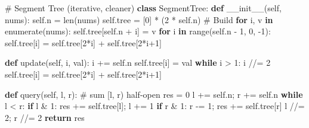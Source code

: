\documentclass[11pt]{article}
\newenvironment{Shaded}{\begin{snugshade}}{\end{snugshade}}
\newcommand{\BuiltInTok}[1]{\textcolor[rgb]{0.50,0.55,0.55}{#1}}
\newcommand{\CommentTok}[1]{\textcolor[rgb]{0.48,0.49,0.49}{#1}}
\newcommand{\ControlFlowTok}[1]{\textcolor[rgb]{0.99,0.74,0.29}{\textbf{#1}}}
\newcommand{\DecValTok}[1]{\textcolor[rgb]{0.96,0.45,0.00}{#1}}
\newcommand{\FunctionTok}[1]{\textcolor[rgb]{0.56,0.27,0.68}{#1}}
\newcommand{\KeywordTok}[1]{\textcolor[rgb]{0.81,0.81,0.76}{\textbf{#1}}}
\newcommand{\NormalTok}[1]{\textcolor[rgb]{0.81,0.81,0.76}{#1}}
\newcommand{\OperatorTok}[1]{\textcolor[rgb]{0.81,0.81,0.76}{#1}}
\newcommand{\VariableTok}[1]{\textcolor[rgb]{0.15,0.68,0.68}{#1}}
\begin{document}
\begin{Shaded}
\begin{Highlighting}[]
\CommentTok{\# Segment Tree (iterative, cleaner)}
\KeywordTok{class}\NormalTok{ SegmentTree:}
    \KeywordTok{def} \FunctionTok{\_\_init\_\_}\NormalTok{(}\VariableTok{self}\NormalTok{, nums):}
        \VariableTok{self}\NormalTok{.n }\OperatorTok{=} \BuiltInTok{len}\NormalTok{(nums)}
        \VariableTok{self}\NormalTok{.tree }\OperatorTok{=}\NormalTok{ [}\DecValTok{0}\NormalTok{] }\OperatorTok{*}\NormalTok{ (}\DecValTok{2} \OperatorTok{*} \VariableTok{self}\NormalTok{.n)}
        \CommentTok{\# Build}
        \ControlFlowTok{for}\NormalTok{ i, v }\KeywordTok{in} \BuiltInTok{enumerate}\NormalTok{(nums):}
            \VariableTok{self}\NormalTok{.tree[}\VariableTok{self}\NormalTok{.n }\OperatorTok{+}\NormalTok{ i] }\OperatorTok{=}\NormalTok{ v}
        \ControlFlowTok{for}\NormalTok{ i }\KeywordTok{in} \BuiltInTok{range}\NormalTok{(}\VariableTok{self}\NormalTok{.n }\OperatorTok{{-}} \DecValTok{1}\NormalTok{, }\DecValTok{0}\NormalTok{, }\OperatorTok{{-}}\DecValTok{1}\NormalTok{):}
            \VariableTok{self}\NormalTok{.tree[i] }\OperatorTok{=} \VariableTok{self}\NormalTok{.tree[}\DecValTok{2}\OperatorTok{*}\NormalTok{i] }\OperatorTok{+} \VariableTok{self}\NormalTok{.tree[}\DecValTok{2}\OperatorTok{*}\NormalTok{i}\OperatorTok{+}\DecValTok{1}\NormalTok{]}

    \KeywordTok{def}\NormalTok{ update(}\VariableTok{self}\NormalTok{, i, val):}
\NormalTok{        i }\OperatorTok{+=} \VariableTok{self}\NormalTok{.n}
        \VariableTok{self}\NormalTok{.tree[i] }\OperatorTok{=}\NormalTok{ val}
        \ControlFlowTok{while}\NormalTok{ i }\OperatorTok{\textgreater{}} \DecValTok{1}\NormalTok{:}
\NormalTok{            i }\OperatorTok{//=} \DecValTok{2}
            \VariableTok{self}\NormalTok{.tree[i] }\OperatorTok{=} \VariableTok{self}\NormalTok{.tree[}\DecValTok{2}\OperatorTok{*}\NormalTok{i] }\OperatorTok{+} \VariableTok{self}\NormalTok{.tree[}\DecValTok{2}\OperatorTok{*}\NormalTok{i}\OperatorTok{+}\DecValTok{1}\NormalTok{]}

    \KeywordTok{def}\NormalTok{ query(}\VariableTok{self}\NormalTok{, l, r):         }\CommentTok{\# sum [l, r) half{-}open}
\NormalTok{        res }\OperatorTok{=} \DecValTok{0}
\NormalTok{        l }\OperatorTok{+=} \VariableTok{self}\NormalTok{.n}\OperatorTok{;}\NormalTok{ r }\OperatorTok{+=} \VariableTok{self}\NormalTok{.n}
        \ControlFlowTok{while}\NormalTok{ l }\OperatorTok{\textless{}}\NormalTok{ r:}
            \ControlFlowTok{if}\NormalTok{ l }\OperatorTok{\&} \DecValTok{1}\NormalTok{: res }\OperatorTok{+=} \VariableTok{self}\NormalTok{.tree[l]}\OperatorTok{;}\NormalTok{ l }\OperatorTok{+=} \DecValTok{1}
            \ControlFlowTok{if}\NormalTok{ r }\OperatorTok{\&} \DecValTok{1}\NormalTok{: r }\OperatorTok{{-}=} \DecValTok{1}\OperatorTok{;}\NormalTok{ res }\OperatorTok{+=} \VariableTok{self}\NormalTok{.tree[r]}
\NormalTok{            l }\OperatorTok{//=} \DecValTok{2}\OperatorTok{;}\NormalTok{ r }\OperatorTok{//=} \DecValTok{2}
        \ControlFlowTok{return}\NormalTok{ res}
\end{Highlighting}
\end{Shaded}
\end{document}
